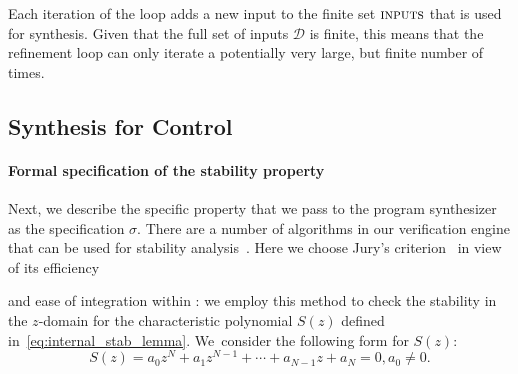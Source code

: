 \documentclass[final]{sig-alternate-05-2015}
\newcommand{\aabatecmt}[1]{}%
\newcommand{\red}[1]{{\color{red}#1}}
\begin{document}

Each iteration of the loop adds a new input to the finite set $\text{\sc
inputs}$ that is used for synthesis.  Given that the full set of inputs
$\mathcal{D}$ is finite, this means that the refinement loop can only
iterate a potentially very large, but finite number of times.

\subsection{Synthesis for Control}
\label{synthesis-elements}

\paragraph{Formal specification of the stability property}

Next, we describe the specific property that we pass to the program
synthesizer as the specification $\sigma$.  There are a number of 
algorithms in our verification engine that can be used for stability analysis~\cite{daes20161, Bessa16}.  
Here we choose Jury's criterion~\cite{astrom1997computer} in view of its efficiency 
\aabatecmt{[check correctness]} 
and ease of integration within \tool: 
we employ this method to check the stability in the $z$-domain for the
characteristic polynomial $S(z)$ defined in~\eqref{eq:internal_stab_lemma}.
%
%
We~consider the following form for $S(z)$:
%
\begin{equation*}
S(z) = a_0z^N+a_1z^{N-1}+\cdots+a_{N-1}z+a_N=0, a_0\neq0. 
\end{equation*}
\end{document}

